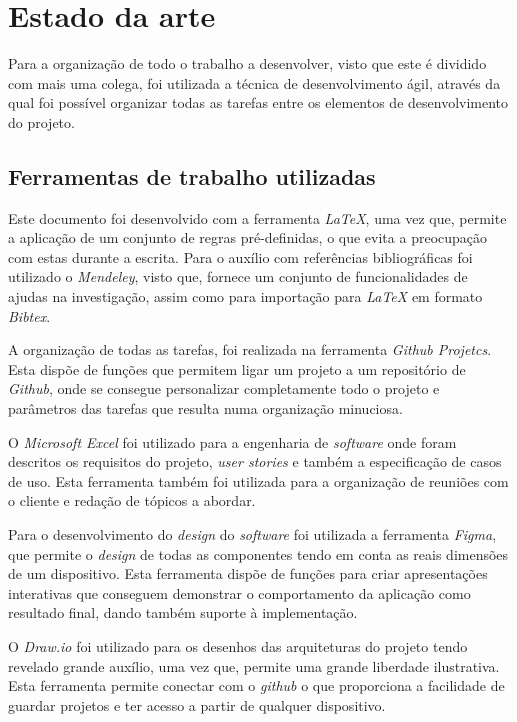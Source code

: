
\chapter{Estado da arte}
Para a organização de todo o trabalho a desenvolver, visto que este é dividido com mais uma colega, foi utilizada a técnica de desenvolvimento ágil, através da qual foi possível organizar todas as tarefas entre os elementos de desenvolvimento do projeto.

\section{Ferramentas de trabalho utilizadas}

Este documento foi desenvolvido com a ferramenta \emph{LaTeX}, uma vez que, permite a aplicação de um conjunto de regras pré-definidas, o que evita a preocupação com estas durante a escrita. Para o auxílio com referências bibliográficas foi utilizado o \emph{Mendeley}, visto que, fornece um conjunto de funcionalidades de ajudas na investigação, assim como para importação para \emph{LaTeX} em formato \emph{Bibtex}.

A organização de todas as tarefas, foi realizada na ferramenta \textit{Github Projetcs}. Esta dispõe de funções que permitem ligar um projeto a um repositório de \textit{Github}, onde se consegue personalizar completamente todo o projeto e parâmetros das tarefas que resulta numa organização minuciosa.

O \textit{Microsoft Excel} foi utilizado para a engenharia de \textit{software} onde foram descritos os requisitos do projeto, \textit{user stories} e também a especificação de casos de uso. Esta ferramenta também foi utilizada para a organização de reuniões com o cliente e redação de tópicos a abordar.

Para o desenvolvimento do \textit{design} do \textit{software} foi utilizada a ferramenta \textit{Figma}, que permite o \textit{design} de todas as componentes tendo em conta as reais dimensões de um dispositivo. Esta ferramenta dispõe de funções para criar apresentações interativas que conseguem demonstrar o comportamento da aplicação como resultado final, dando também suporte à implementação.

O \textit{Draw.io} foi utilizado para os desenhos das arquiteturas do projeto tendo revelado grande auxílio, uma vez que, permite uma grande liberdade ilustrativa. Esta ferramenta permite conectar com o \textit{github} o que proporciona a facilidade de guardar projetos e ter acesso a partir de qualquer dispositivo.


